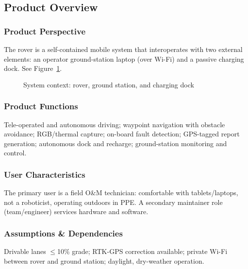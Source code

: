 \documentclass[11pt,letterpaper]{article}
\begin{document}
\subsection{Product Overview}
\subsubsection{Product Perspective}
The rover is a self-contained mobile system that interoperates with two external
elements: an operator ground-station laptop (over Wi-Fi) and a passive charging
dock. See Figure~\ref{fig:ctx}.
\begin{figure}[h!]\centering{}
\caption{System context: rover, ground station, and charging dock}\label{fig:ctx}\end{figure}
\subsubsection{Product Functions}
Tele-operated and autonomous driving; waypoint navigation with obstacle avoidance;
RGB/thermal capture; on-board fault detection; GPS-tagged report generation;
autonomous dock and recharge; ground-station monitoring and control.
\subsubsection{User Characteristics}
The primary user is a field O\&M technician: comfortable with tablets/laptops, not
a roboticist, operating outdoors in PPE. A secondary maintainer role (team/engineer)
services hardware and software.
\subsubsection{Assumptions \& Dependencies}
Drivable lanes $\leq$10\% grade; RTK-GPS correction available; private Wi-Fi
between rover and ground station; daylight, dry-weather operation.
\end{document}
